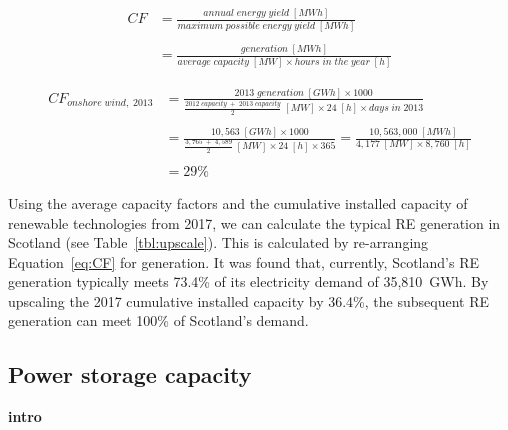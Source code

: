 







	\begin{equation}\label{eq:CF}
		\begin{split}
			CF & = \frac{annual\;energy\;yield\;[MWh]}{maximum\;possible\;energy\;yield\;[MWh]} \\
			& \\
			& = \frac{generation\;[MWh]}{average\;capacity\;[MW] \times hours\;in\;the\;year\;[h]}
		\end{split}
	\end{equation}

	\begin{equation}\label{eq:CF_example}
		\begin{split}
			CF_{onshore\;wind,\;2013} & = \frac{2013\;generation\;[GWh] \times 1000}{\frac{2012\;capacity\;+\;2013\;capacity}{2}\;[MW] \times 24\;[h] \times days\;in\;2013} \\
			& \\
			& = \frac{10,563\;[GWh] \times 1000}{\frac{3,765\;+\;4,589}{2}\;[MW] \times 24\;[h] \times 365} = \frac{10,563,000\;[MWh]}{4,177\;[MW] \times 8,760\;[h]} \\
			& \\
			& = 29\%
		\end{split}
	\end{equation}

Using the average capacity factors and the cumulative installed capacity of renewable technologies from 2017, we can calculate the typical RE generation in Scotland (see Table~\ref{tbl:upscale}).
This is calculated by re-arranging Equation~\ref{eq:CF} for generation.
It was found that, currently, Scotland's RE generation typically meets 73.4\% of its electricity demand of 35,810~GWh.
By upscaling the 2017 cumulative installed capacity by 36.4\%, the subsequent RE generation can meet 100\% of Scotland's demand.






\subsection{Power storage capacity}

\textbf{intro}




